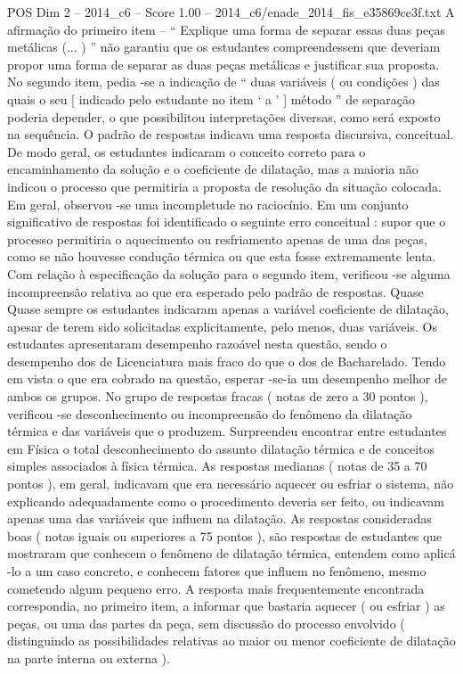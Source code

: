 \begin{textsample}{POS Dim 2 – 2014\_c6 – Score 1.00 – 2014\_c6/enade\_2014\_fis\_e35869ce3f.txt}
A afirmação do primeiro item – “ Explique uma forma de separar essas duas peças metálicas (... ) ” não garantiu que os estudantes compreendessem que deveriam propor uma forma de separar as duas peças metálicas e justificar sua proposta.
No segundo item, pedia -se a indicação de “ duas variáveis ( ou condições ) das quais o seu [ indicado pelo estudante no item ‘ a ’ ] método ” de separação poderia depender, o que possibilitou interpretações diversas, como será exposto na sequência.
O padrão de respostas indicava uma resposta discursiva, conceitual.
De modo geral, os estudantes indicaram o conceito correto para o encaminhamento da solução e o coeficiente de dilatação, mas a maioria não indicou o processo que permitiria a proposta de resolução da situação colocada.
Em geral, observou -se uma incompletude no raciocínio.
Em um conjunto significativo de respostas foi identificado o seguinte erro conceitual : supor que o processo permitiria o aquecimento ou resfriamento apenas de uma das peças, como se não houvesse condução térmica ou que esta fosse extremamente lenta.
Com relação à especificação da solução para o segundo item, verificou -se alguma incompreensão relativa ao que era esperado pelo padrão de respostas.
Quase Quase sempre os estudantes indicaram apenas a variável coeficiente de dilatação, apesar de terem sido solicitadas explicitamente, pelo menos, duas variáveis.
Os estudantes apresentaram desempenho razoável nesta questão, sendo o desempenho dos de Licenciatura mais fraco do que o dos de Bacharelado.
Tendo em vista o que era cobrado na questão, esperar -se-ia um desempenho melhor de ambos os grupos.
No grupo de respostas fracas ( notas de zero a 30 pontos ), verificou -se desconhecimento ou incompreensão do fenômeno da dilatação térmica e das variáveis que o produzem.
Surpreendeu encontrar entre estudantes em Física o total desconhecimento do assunto dilatação térmica e de conceitos simples associados à física térmica.
As respostas medianas ( notas de 35 a 70 pontos ), em geral, indicavam que era necessário aquecer ou esfriar o sistema, não explicando adequadamente como o procedimento deveria ser feito, ou indicavam apenas uma das variáveis que influem na dilatação.
As respostas consideradas boas ( notas iguais ou superiores a 75 pontos ), são respostas de estudantes que mostraram que conhecem o fenômeno de dilatação térmica, entendem como aplicá -lo a um caso concreto, e conhecem fatores que influem no fenômeno, mesmo cometendo algum pequeno erro.
A resposta mais frequentemente encontrada correspondia, no primeiro item, a informar que bastaria aquecer ( ou esfriar ) as peças, ou uma das partes da peça, sem discussão do processo envolvido ( distinguindo as possibilidades relativas ao maior ou menor coeficiente de dilatação na parte interna ou externa ).

\end{textsample}
